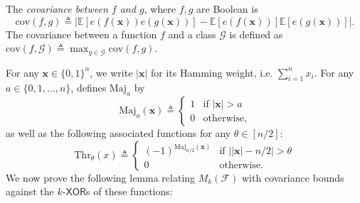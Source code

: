 \begin{definition}
The \emph{covariance between $f$ and $g$}, where $f,g$ are Boolean is 
\begin{equation*}
    \mathrm{cov}(f,g)\triangleq 
    \bigl| \mathbb{E}[e(f(\mathbf{x}))e(g(\mathbf{x}))] - \mathbb{E}[e(f(\mathbf{x}))]\mathbb{E}[e(g(\mathbf{x}))] \bigr|.
\end{equation*}
The covariance between a function $f$ and a class $\mathcal{G}$ is defined as $\mathrm{cov}(f,\mathcal{G})\triangleq \max_{g\in \mathcal{G}} \mathrm{cov}(f,g)$.
\end{definition}

For any $\mathbf{x}\in \{0,1\}^n$, we write $\vert \mathbf{x}\vert$ for its Hamming weight, i.e. $\sum_{i=1}^n x_i$. For any $a\in \{0,1,\ldots,n\}$, \cite{xorlemma} defines $\mathrm{Maj}_a$ by
\begin{equation*}
    \mathrm{Maj}_a(\mathbf{x})\triangleq \begin{cases}
    1 & \text{if $\vert \mathbf{x}\vert> a$}\\
    0 & \text{otherwise},
    \end{cases}
\end{equation*}
as well as the following associated functions for any $\theta\in [n/2]$:
\begin{equation*}
    \mathrm{Thr}_{\theta}(x)\triangleq \begin{cases}
    (-1)^{\mathrm{Maj}_{n/2}(\mathbf{x})} & \text{if $\big\vert\vert \mathbf{x}\vert-n/2\big\vert> \theta$}\\
    0 & \text{otherwise.}
    \end{cases}
\end{equation*}
We now prove the following lemma relating $M_k(\mathcal{F})$ with covariance bounds against the $k$-$\mathsf{XOR}$s of these functions:


